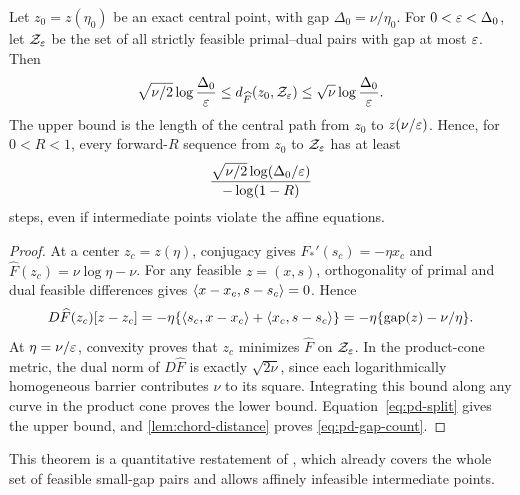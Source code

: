 \begin{theorem}
\label{thm:pd-gap-set}
Let $z_0=z(\eta_0)$ be an exact central point, with gap
$\Delta_0=\nu/\eta_0$. For $0<\varepsilon<\Delta_0$, let $\mathcal Z_\varepsilon$ be
the set of all strictly feasible primal--dual pairs with gap at most
$\varepsilon$. Then
\begin{equation}
 \sqrt{\nu/2}\log\frac{\Delta_0}{\varepsilon}
 \leq d_{\widehat F}(z_0,\mathcal Z_\varepsilon)
 \leq \sqrt\nu\log\frac{\Delta_0}{\varepsilon}.
 \label{eq:pd-gap-set}
\end{equation}
The upper bound is the length of the central path from $z_0$ to
$z(\nu/\varepsilon)$. Hence, for $0<R<1$, every forward-$R$ sequence
from $z_0$ to $\mathcal Z_\varepsilon$ has at least
\begin{equation}
 \frac{\sqrt{\nu/2}\log(\Delta_0/\varepsilon)}{-\log(1-R)}
 \label{eq:pd-gap-count}
\end{equation}
steps, even if intermediate points violate the affine equations.
\end{theorem}
\begin{proof}
At a center $z_c=z(\eta)$, conjugacy gives
$F_*'(s_c)=-\eta x_c$ and
$\widehat F(z_c)=\nu\log\eta-\nu$.
For any feasible $z=(x,s)$, orthogonality of primal and dual feasible
differences gives $\langle x-x_c,s-s_c\rangle=0$. Hence
\[
 D\widehat F(z_c)[z-z_c]
 =-\eta\{\langle s_c,x-x_c\rangle+\langle x_c,s-s_c\rangle\}
 =-\eta\{\operatorname{gap}(z)-\nu/\eta\}.
\]
At $\eta=\nu/\varepsilon$, convexity proves that $z_c$ minimizes
$\widehat F$ on $\mathcal Z_\varepsilon$.
In the product-cone metric, the dual norm of $D\widehat F$ is exactly
$\sqrt{2\nu}$, since each logarithmically homogeneous barrier
contributes $\nu$ to its square. Integrating this bound along any curve
in the product cone proves the lower bound. Equation~\eqref{eq:pd-split} gives the upper bound, and
\cref{lem:chord-distance} proves \eqref{eq:pd-gap-count}.
\end{proof}
This theorem is a quantitative restatement of
\cite[Theorem~5.1(c), Theorem~5.2, and Corollary~5.1]{NesterovTodd2002},
which already covers the whole set of feasible small-gap pairs and
allows affinely infeasible intermediate points.

